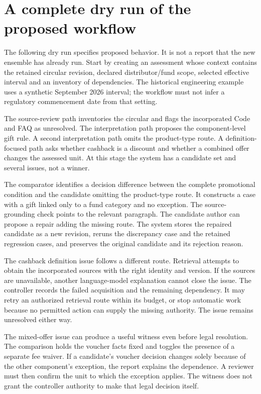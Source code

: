 \documentclass[12pt,a4paper,oneside,openany]{book}
\begin{document}
\section{A complete dry run of the proposed workflow}
\label{merge:M02:07}

\label{sec:circular-dryrun}
The following dry run specifies proposed behavior. It is not a report that the
new ensemble has already run. Start by creating an assessment whose context
contains the retained circular revision, declared distributor/fund scope,
selected effective interval and an inventory of dependencies. The historical
engineering example uses a synthetic September 2026 interval; the workflow must
not infer a regulatory commencement date from that setting.

The source-review path inventories the circular and flags the incorporated Code
and FAQ as unresolved. The interpretation path proposes the component-level
gift rule. A second interpretation path omits the product-type route. A
definition-focused path asks whether cashback is a discount and whether a
combined offer changes the assessed unit. At this stage the system has a
candidate set and several issues, not a winner.

The comparator identifies a decision difference between the complete promotional
condition and the candidate omitting the product-type route. It constructs a
case with a gift linked only to a fund category and no exception. The
source-grounding check points to the relevant paragraph. The candidate author
can propose a repair adding the missing route. The system stores the repaired
candidate as a new revision, reruns the discrepancy case and the retained
regression cases, and preserves the original candidate and its rejection reason.

The cashback definition issue follows a different route. Retrieval attempts to
obtain the incorporated sources with the right identity and version. If the
sources are unavailable, another language-model explanation cannot close the
issue. The controller records the failed acquisition and the remaining
dependency. It may retry an authorized retrieval route within its budget, or
stop automatic work because no permitted action can supply the missing
authority. The issue remains unresolved either way.

The mixed-offer issue can produce a useful witness even before legal resolution.
The comparison holds the voucher facts fixed and toggles the presence of a
separate fee waiver. If a candidate's voucher decision changes solely because
of the other component's exception, the report explains the dependence. A
reviewer must then confirm the unit to which the exception applies. The witness
does not grant the controller authority to make that legal decision itself.
\end{document}
